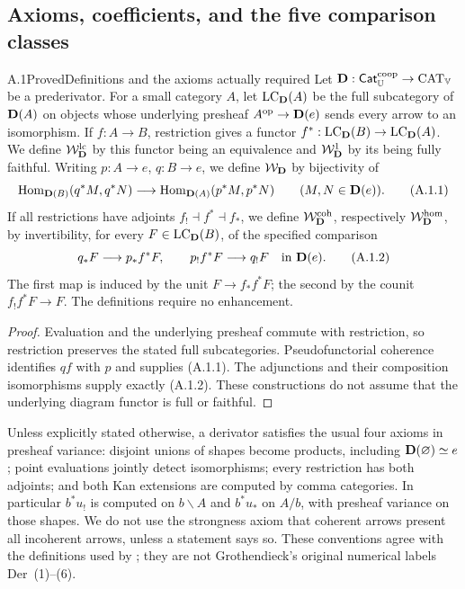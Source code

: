 \subsection{Axioms, coefficients, and the five comparison classes}

\begin{claim}{A.1}{Proved}{Definitions and the axioms actually required}
Let $\mathbf D:\mathsf{Cat}_{\mathbb U}^{\mathrm{coop}}\to\mathrm{CAT}_{\mathbb V}$ be a
prederivator. For a small category $A$, let $\operatorname{LC}_\mathbf D(A)$ be the full
subcategory of $\mathbf D(A)$ on objects whose underlying presheaf
$A^{\mathrm{op}}\to\mathbf D(e)$ sends every arrow to an isomorphism. If
$f:A\to B$, restriction gives a functor
$f^*:\operatorname{LC}_\mathbf D(B)\to\operatorname{LC}_\mathbf D(A)$. We define $\mathcal W_{\mathbf D}^{\mathrm{lc}}$ by this functor
being an equivalence and $\mathcal W_{\mathbf D}^{1}$ by its being fully faithful.
Writing $p:A\to e$, $q:B\to e$, we define $\mathcal W_{\mathbf D}$ by bijectivity of
\[
 \operatorname{Hom}_{\mathbf D(B)}(q^*M,q^*N)\longrightarrow
 \operatorname{Hom}_{\mathbf D(A)}(p^*M,p^*N)\qquad(M,N\in\mathbf D(e)).
 \tag{A.1.1}
\]
If all restrictions have adjoints $f_!\dashv f^*\dashv f_*$, we
define $\mathcal W_{\mathbf D}^{\mathrm{coh}}$, respectively $\mathcal W_{\mathbf D}^{\mathrm{hom}}$, by invertibility, for every
$F\in\operatorname{LC}_\mathbf D(B)$, of the specified comparison
\[
 q_*F\longrightarrow p_*f^*F,
 \qquad
 p_!f^*F\longrightarrow q_!F
 \quad\text{in }\mathbf D(e).
 \tag{A.1.2}
\]
The first map is induced by the unit $F\to f_*f^*F$; the second by
the counit $f_!f^*F\to F$. The definitions require no enhancement.
\end{claim}
\begin{proof}
Evaluation and the underlying presheaf commute with restriction, so
restriction preserves the stated full subcategories. Pseudofunctorial
coherence identifies $qf$ with $p$ and supplies (A.1.1).
The adjunctions and their composition isomorphisms supply exactly
(A.1.2). These constructions do not assume that the underlying diagram
functor is full or faithful.
\end{proof}

Unless explicitly stated otherwise, a derivator satisfies the usual four
axioms in presheaf variance: disjoint unions of shapes become products,
including $\mathbf D(\varnothing)\simeq e$; point evaluations jointly detect
isomorphisms; every restriction has both adjoints; and both Kan extensions
are computed by comma categories. In particular $b^*u_!$ is computed on
$b\backslash A$ and $b^*u_*$ on $A/b$, with presheaf variance on those
shapes. We do not use the strongness axiom that coherent arrows present
all incoherent arrows, unless a statement says so. These conventions agree
with the definitions used by \citet[\S3.2]{Cisinski2009LocallyConstant}; they are not
Grothendieck's original numerical labels Der~(1)--(6).

